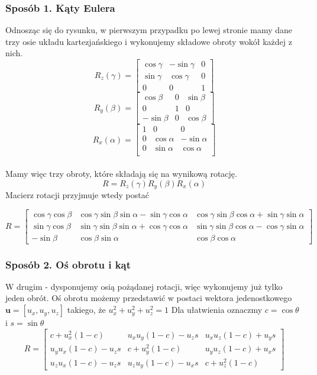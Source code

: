 \documentclass[12pt]{article}
\begin{document}
\subsubsection{Sposób 1. Kąty Eulera}
Odnosząc się do rysunku, w pierwszym przypadku po lewej stronie mamy dane trzy osie układu kartezjańskiego i wykonujemy składowe obroty wokół każdej z nich. 
\[
R_{z}(\gamma) = \begin{bmatrix}
\cos \gamma & -\sin \gamma & 0 \\
\sin \gamma & \cos \gamma & 0 \\
0 & 0 & 1
\end{bmatrix}
\]
\[
R_{y}(\beta) = \begin{bmatrix}
\cos \beta & 0 & \sin \beta \\
0 & 1 & 0 \\
-\sin \beta & 0 & \cos \beta
\end{bmatrix}
\]
\[
R_{x}(\alpha) = \begin{bmatrix}
1 & 0 & 0 \\
0 & \cos \alpha & -\sin \alpha \\
0 & \sin \alpha & \cos \alpha \\
\end{bmatrix}
\]
\\
Mamy więc trzy obroty, które składają się na wynikową rotację.
\\
\[R = R_{z}(\gamma)R_{y}(\beta)R_{x}(\alpha)\]
Macierz rotacji przyjmuje wtedy postać

\[
R = \begin{bmatrix}
\cos \gamma \cos \beta & 
\cos \gamma \sin \beta \sin \alpha - \sin \gamma \cos \alpha &
\cos \gamma \sin \beta \cos \alpha + \sin \gamma \sin \alpha \\
\sin \gamma \cos \beta &
\sin \gamma \sin \beta \sin \alpha + \cos \gamma \cos \alpha &
\sin \gamma \sin \beta \cos \alpha - \cos \gamma \sin \alpha \\
-\sin \beta & \cos \beta \sin \alpha & \cos \beta \cos \alpha
\end{bmatrix}
\]

\subsubsection{Sposób 2. Oś obrotu i kąt}
W drugim - dysponujemy osią pożądanej rotacji, więc wykonujemy już tylko jeden obrót. Oś obrotu możemy przedstawić w postaci wektora jedenostkowego $\textbf{u} = [u_{x}, u_{y}, u_{z}]$ takiego, że $u_{x}^2+u_{y}^2+u_{z}^2 = 1$ 
Dla ułatwienia oznaczmy $c = \cos \theta$ i $s = \sin \theta$
\[
R = \begin{bmatrix}
c+u_{x}^2(1-c) & u_{x}u_{y}(1-c)-u_{z}s & u_{x}u_{z}(1-c)+u_{y}s \\
u_{y}u_{x}(1-c)-u_{z}s & c+u_{y}^2(1-c) & u_{y}u_{z}(1-c)+u_{x}s \\
u_{z}u_{x}(1-c)-u_{z}s & u_{z}u_{y}(1-c)-u_{x}s & c+u_{z}^2(1-c)
\end{bmatrix}
\]
\end{document}
